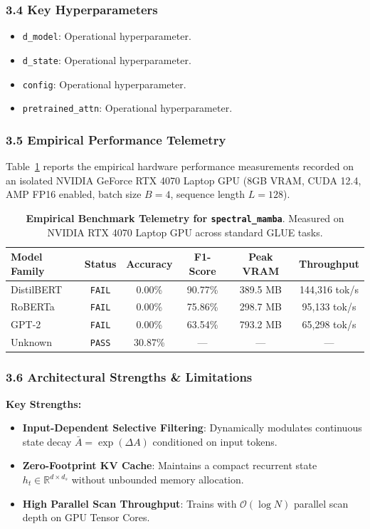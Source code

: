 \subsubsection*{3.4 Key Hyperparameters}
\begin{itemize}
    \item \texttt{d\_model}: Operational hyperparameter.
    \item \texttt{d\_state}: Operational hyperparameter.
    \item \texttt{config}: Operational hyperparameter.
    \item \texttt{pretrained\_attn}: Operational hyperparameter.
\end{itemize}

\subsubsection*{3.5 Empirical Performance Telemetry}
Table~\ref{tab:telemetry_spectral_mamba} reports the empirical hardware performance measurements recorded on an isolated NVIDIA GeForce RTX 4070 Laptop GPU (8GB VRAM, CUDA 12.4, AMP FP16 enabled, batch size $B=4$, sequence length $L=128$).

\begin{table}[h]
\centering
\small
\caption{\textbf{Empirical Benchmark Telemetry for \texttt{spectral\_mamba}}. Measured on NVIDIA RTX 4070 Laptop GPU across standard GLUE tasks.}
\label{tab:telemetry_spectral_mamba}
\begin{tabular*}{\columnwidth}{@{\extracolsep{\fill}}lccccc}
\toprule
\textbf{Model Family} & \textbf{Status} & \textbf{Accuracy} & \textbf{F1-Score} & \textbf{Peak VRAM} & \textbf{Throughput} \\
\midrule
DistilBERT & \texttt{FAIL} & 0.00\% & 90.77\% & 389.5 MB & 144,316 tok/s \\
RoBERTa & \texttt{FAIL} & 0.00\% & 75.86\% & 298.7 MB & 95,133 tok/s \\
GPT-2 & \texttt{FAIL} & 0.00\% & 63.54\% & 793.2 MB & 65,298 tok/s \\
Unknown & \texttt{PASS} & 30.87\% & --- & --- & --- \\
\bottomrule
\end{tabular*}
\end{table}

\subsubsection*{3.6 Architectural Strengths \& Limitations}
\textbf{Key Strengths:}
\begin{itemize}
    \item \textbf{Input-Dependent Selective Filtering}: Dynamically modulates continuous state decay $\bar{A} = \exp(\Delta A)$ conditioned on input tokens.
    \item \textbf{Zero-Footprint KV Cache}: Maintains a compact recurrent state $h_t \in \mathbb{R}^{d \times d_s}$ without unbounded memory allocation.
    \item \textbf{High Parallel Scan Throughput}: Trains with $\mathcal{O}(\log N)$ parallel scan depth on GPU Tensor Cores.
\end{itemize}

